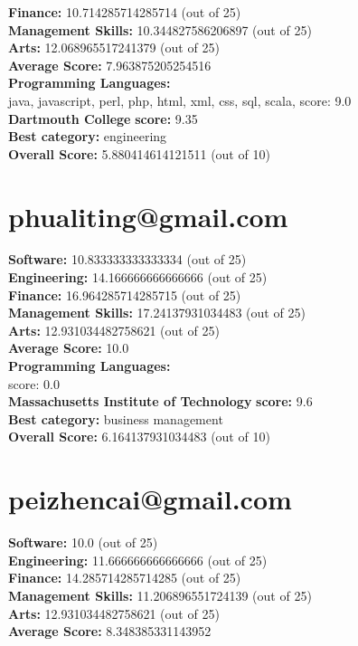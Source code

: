 \documentclass{article}
\begin{document}
\textbf{Finance:} 10.714285714285714 (out of 25)\\
\textbf{Management Skills:} 10.344827586206897 (out of 25)\\
\textbf{Arts:} 12.068965517241379 (out of 25)\\
\textbf{Average Score: } 7.963875205254516\\
\textbf{Programming Languages:} \\
java, javascript, perl, php, html, xml, css, sql, scala, score: 9.0\\
\textbf{Dartmouth College} \textbf{score:} 9.35\\
\textbf{Best category: } engineering\\
\textbf{Overall Score: }5.880414614121511 (out of 10)\section{phualiting@gmail.com}
\textbf{Software:} 10.833333333333334 (out of 25)\\
\textbf{Engineering: } 14.166666666666666 (out of 25)\\
\textbf{Finance:} 16.964285714285715 (out of 25)\\
\textbf{Management Skills:} 17.24137931034483 (out of 25)\\
\textbf{Arts:} 12.931034482758621 (out of 25)\\
\textbf{Average Score: } 10.0\\
\textbf{Programming Languages:} \\
score: 0.0\\
\textbf{Massachusetts Institute of Technology} \textbf{score:} 9.6\\
\textbf{Best category: } business management\\
\textbf{Overall Score: }6.164137931034483 (out of 10)\section{peizhencai@gmail.com}
\textbf{Software:} 10.0 (out of 25)\\
\textbf{Engineering: } 11.666666666666666 (out of 25)\\
\textbf{Finance:} 14.285714285714285 (out of 25)\\
\textbf{Management Skills:} 11.206896551724139 (out of 25)\\
\textbf{Arts:} 12.931034482758621 (out of 25)\\
\textbf{Average Score: } 8.348385331143952\\
\end{document}
